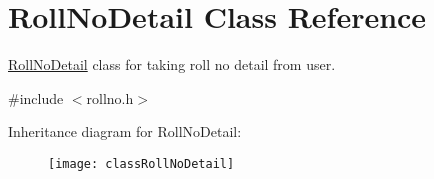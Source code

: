\hypertarget{classRollNoDetail}{\section{Roll\-No\-Detail Class Reference}
\label{classRollNoDetail}
}


\hyperlink{classRollNoDetail}{Roll\-No\-Detail} class for taking roll no detail from user.  




{\ttfamily \#include $<$rollno.\-h$>$}

Inheritance diagram for Roll\-No\-Detail\-:\begin{figure}[H]
\begin{center}
\leavevmode
\texttt{[image: classRollNoDetail]}
\end{center}
\end{figure}
